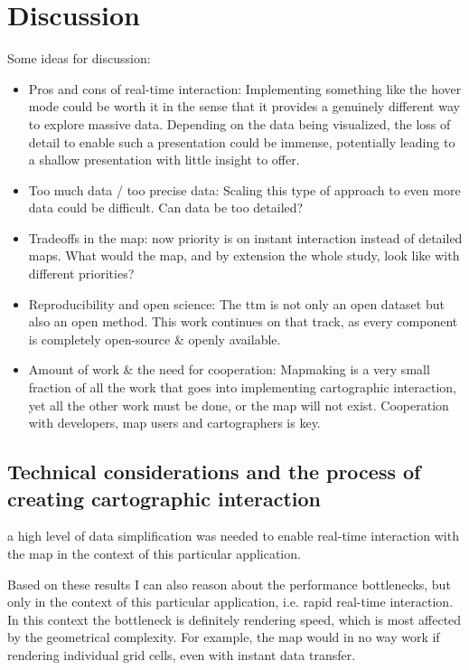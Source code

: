 \section{Discussion}

Some ideas for discussion:
\begin{itemize}
	\item Pros and cons of real-time interaction:
	Implementing something like the hover mode could be worth it in the sense
	that it provides a genuinely different way to explore massive data.
	Depending on the data being visualized,
	the loss of detail to enable such a presentation could be immense,
	potentially leading to a shallow presentation with little insight to offer.
	\item Too much data / too precise data:
	Scaling this type of approach to even more data could be difficult. Can data be too detailed?
	\item Tradeoffs in the map:
	now priority is on instant interaction instead of detailed maps.
	What would the map, and by extension the whole study, look like with different priorities?
	\item Reproducibility and open science:
	The \acrshort{ttm} is not only an open dataset but also an open method.
	This work continues on that track,
	as every component is completely open-source \& openly available.
	\item Amount of work \& the need for cooperation:
	Mapmaking is a very small fraction of all the work that goes into implementing cartographic interaction,
	yet all the other work must be done, or the map will not exist.
	Cooperation with developers, map users and cartographers is key.
\end{itemize}

\subsection{Technical considerations and the process of creating cartographic interaction}

a high level of data simplification was needed to enable real-time interaction with the map
in the context of this particular application.



Based on these results
I can also reason about the performance bottlenecks,
but only in the context of this particular application, i.e. rapid real-time interaction.
In this context the bottleneck is definitely rendering speed,
which is most affected by the geometrical complexity.
For example, the map would in no way work if rendering individual grid cells,
even with instant data transfer.

